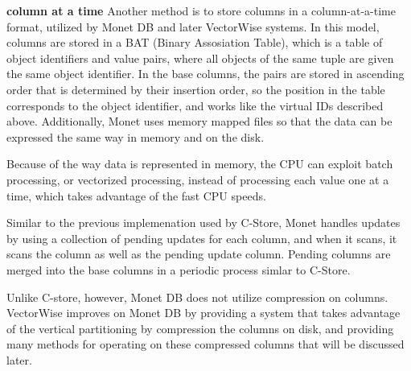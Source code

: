 	\textbf{column at a time} %
	Another method is to store columns in a column-at-a-time format, utilized by Monet DB and later VectorWise systems. In this model, columns are stored in a BAT (Binary Assosiation Table), which is a table of object identifiers and value pairs, where all objects of the same tuple are given the same object identifier. In the base columns, the pairs are stored in ascending order that is determined by their insertion order, so the position in the table corresponds to the object identifier, and works like the virtual IDs described above. Additionally, Monet uses memory mapped files so that the data can be expressed the same way in memory and on the disk\cite{monet}.
	\par
	Because of the way data is represented in memory, the CPU can exploit batch processing, or vectorized processing, instead of processing each value one at a time, which takes advantage of the fast CPU speeds.
\par
	Similar to the previous implemenation used by C-Store, Monet handles updates by using a collection of pending updates for each column, and when it scans, it scans the column as well as the pending update column\cite{now}. Pending columns are merged into the base columns in a periodic process simlar to C-Store.
	\par
	Unlike C-store, however, Monet DB does not utilize compression on columns. VectorWise improves on Monet DB by providing a system that takes advantage of the vertical partitioning by compression the columns on disk\cite{now}, and providing many methods for operating on these compressed columns that will be discussed later.